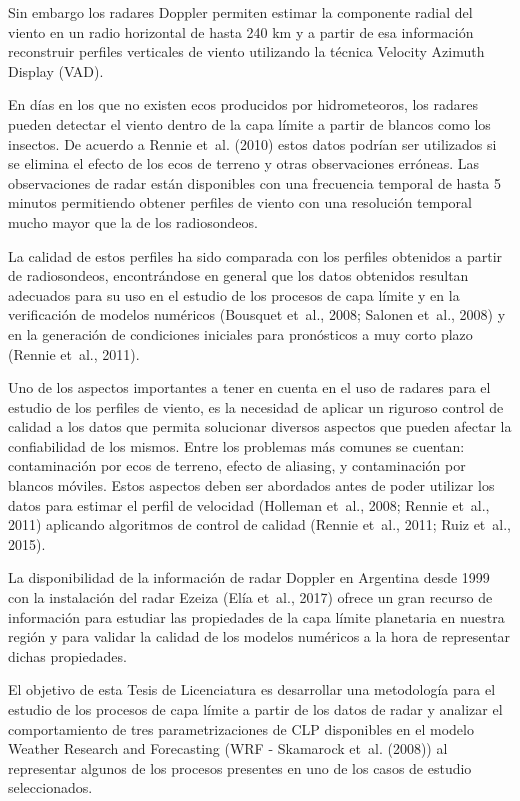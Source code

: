 \documentclass[12pt,spanish,oneside, a4paper]{book}
\begin{document}
Sin embargo los radares Doppler permiten estimar la componente radial
del viento en un radio horizontal de hasta 240 km y a partir de esa
información reconstruir perfiles verticales de viento utilizando la
técnica Velocity Azimuth Display (VAD).

En días en los que no existen ecos producidos por hidrometeoros, los
radares pueden detectar el viento dentro de la capa límite a partir de
blancos como los insectos. De acuerdo a Rennie et~al. (2010) estos datos
podrían ser utilizados si se elimina el efecto de los ecos de terreno y
otras observaciones erróneas. Las observaciones de radar están
disponibles con una frecuencia temporal de hasta 5 minutos permitiendo
obtener perfiles de viento con una resolución temporal mucho mayor que
la de los radiosondeos.

La calidad de estos perfiles ha sido comparada con los perfiles
obtenidos a partir de radiosondeos, encontrándose en general que los
datos obtenidos resultan adecuados para su uso en el estudio de los
procesos de capa límite y en la verificación de modelos numéricos
(Bousquet et~al., 2008; Salonen et~al., 2008) y en la generación de
condiciones iniciales para pronósticos a muy corto plazo (Rennie et~al.,
2011).

Uno de los aspectos importantes a tener en cuenta en el uso de radares
para el estudio de los perfiles de viento, es la necesidad de aplicar un
riguroso control de calidad a los datos que permita solucionar diversos
aspectos que pueden afectar la confiabilidad de los mismos. Entre los
problemas más comunes se cuentan: contaminación por ecos de terreno,
efecto de aliasing, y contaminación por blancos móviles. Estos aspectos
deben ser abordados antes de poder utilizar los datos para estimar el
perfil de velocidad (Holleman et~al., 2008; Rennie et~al., 2011)
aplicando algoritmos de control de calidad (Rennie et~al., 2011; Ruiz
et~al., 2015).

La disponibilidad de la información de radar Doppler en Argentina desde
1999 con la instalación del radar Ezeiza (Elía et~al., 2017) ofrece un
gran recurso de información para estudiar las propiedades de la capa
límite planetaria en nuestra región y para validar la calidad de los
modelos numéricos a la hora de representar dichas propiedades.

El objetivo de esta Tesis de Licenciatura es desarrollar una metodología
para el estudio de los procesos de capa límite a partir de los datos de
radar y analizar el comportamiento de tres parametrizaciones de CLP
disponibles en el modelo Weather Research and Forecasting (WRF -
Skamarock et~al. (2008)) al representar algunos de los procesos
presentes en uno de los casos de estudio seleccionados.
\end{document}
